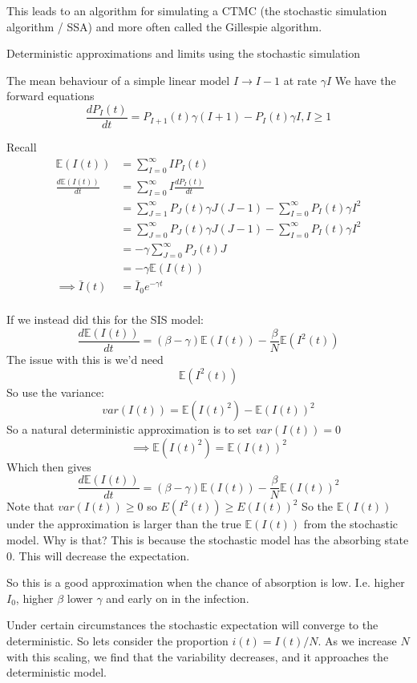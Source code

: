 \documentclass{/home/janmebows/Documents/LatexTemplates/myassignment}
\begin{document}
This leads to an algorithm for simulating a CTMC (the stochastic simulation algorithm / SSA) and more often called the Gillespie algorithm. 






Deterministic approximations and limits using the stochastic simulation

The mean behaviour of a simple linear model
$I \to I-1$ at rate $\gamma I$
We have the forward equations
\[\frac{dP_I(t)}{dt} = P_{I+1}(t) \gamma(I+1) - P_I(t) \gamma I, I \geq 1\]

Recall
\begin{align*}
    \mathbb{E}(I(t)) &= \sum_{I=0}^\infty IP_I(t)\\
\frac{d\mathbb{E}(I(t))}{dt} &= \sum_{I=0}^\infty I\frac{dP_I(t)}{dt}\\
&= \sum_{J=1}^\infty P_{J}(t) \gamma J(J-1) - \sum_{I=0}^\infty P_I(t) \gamma I^2\\
&= \sum_{J=0}^\infty P_{J}(t) \gamma J(J-1) - \sum_{I=0}^\infty P_I(t) \gamma I^2\\
&= -\gamma \sum_{J=0}^\infty P_{J}(t) J\\
&= -\gamma \mathbb{E}(I(t))\\
\implies \bar{I}(t) &= \bar{I}_0 e^{-\gamma t}\\
\end{align*}

If we instead did this for the SIS model:
\[\frac{d \mathbb{E}(I(t))}{dt} = (\beta - \gamma) \mathbb{E}(I(t)) - \frac\beta N \mathbb{E}(I^2(t))\]
The issue with this is we'd need
\[\mathbb{E}(I^2(t))\]
So use the variance:
\[var(I(t)) = \mathbb{E}(I(t)^2) - \mathbb{E}(I(t))^2\]
So a natural deterministic approximation is to set $var(I(t)) = 0$
\[\implies \mathbb{E}(I(t)^2) = \mathbb{E}(I(t))^2\]
Which then gives
\[\frac{d \mathbb{E}(I(t))}{dt} = (\beta - \gamma) \mathbb{E}(I(t)) - \frac\beta N \mathbb{E}(I(t))^2\]
Note that $var(I(t)) \geq 0$ so $E(I^2(t)) \geq E(I(t))^2$
So the $\mathbb{E}(I(t))$ under the approximation is larger than the true $\mathbb{E}(I(t))$ from the stochastic model. Why is that?
This is because the stochastic model has the absorbing state $0$. This will decrease the expectation.

So this is a good approximation when the chance of absorption is low. I.e. higher $I_0$, higher $\beta$ lower $\gamma$ and early on in the infection.

Under certain circumstances the stochastic expectation will converge to the deterministic.
So lets consider the proportion $i(t) = I(t)/N$.
As we increase $N$ with this scaling, we find that the variability decreases, and it approaches the deterministic model.
\end{document}
